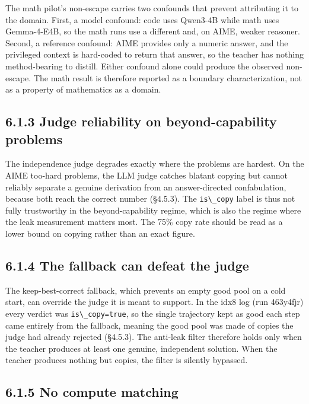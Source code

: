The math pilot's non-escape carries two confounds that prevent attributing it to the domain. First, a model confound: code uses Qwen3-4B while math uses Gemma-4-E4B, so the math runs use a different and, on AIME, weaker reasoner. Second, a reference confound: AIME provides only a numeric answer, and the privileged context is hard-coded to return that answer, so the teacher has nothing method-bearing to distill. Either confound alone could produce the observed non-escape. The math result is therefore reported as a boundary characterization, not as a property of mathematics as a domain.

\subsection{6.1.3 Judge reliability on beyond-capability problems}\label{judge-reliability-on-beyond-capability-problems}

The independence judge degrades exactly where the problems are hardest. On the AIME too-hard problems, the LLM judge catches blatant copying but cannot reliably separate a genuine derivation from an answer-directed confabulation, because both reach the correct number (§4.5.3). The \passthrough{\lstinline!is\_copy!} label is thus not fully trustworthy in the beyond-capability regime, which is also the regime where the leak measurement matters most. The 75\% copy rate should be read as a lower bound on copying rather than an exact figure.

\subsection{6.1.4 The fallback can defeat the judge}\label{the-fallback-can-defeat-the-judge}

The keep-best-correct fallback, which prevents an empty good pool on a cold start, can override the judge it is meant to support. In the idx8 log (run 463y4fjr) every verdict was \passthrough{\lstinline!is\_copy=true!}, so the single trajectory kept as good each step came entirely from the fallback, meaning the good pool was made of copies the judge had already rejected (§4.5.3). The anti-leak filter therefore holds only when the teacher produces at least one genuine, independent solution. When the teacher produces nothing but copies, the filter is silently bypassed.

\subsection{6.1.5 No compute matching}\label{no-compute-matching}


